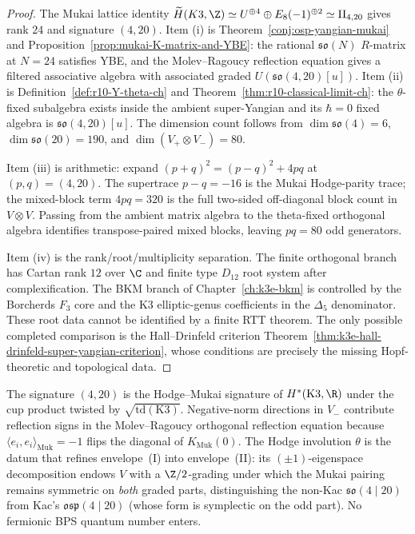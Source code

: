 \begin{proof}
The Mukai lattice identity
$\widetilde H(K3,\Z)\simeq U^{\oplus 4}\oplus E_8(-1)^{\oplus 2}
\simeq \mathrm{II}_{4,20}$ gives rank $24$ and signature $(4,20)$.
Item \textup{(i)} is Theorem~\ref{conj:osp-yangian-mukai} and
Proposition~\ref{prop:mukai-K-matrix-and-YBE}: the rational
$\mathfrak{so}(N)$ $R$-matrix at $N=24$ satisfies YBE, and the
Molev--Ragoucy reflection equation gives a filtered associative
algebra with associated graded $U(\mathfrak{so}(4,20)[u])$.
Item \textup{(ii)} is Definition~\ref{def:r10-Y-theta-ch} and
Theorem~\ref{thm:r10-classical-limit-ch}: the $\theta$-fixed
subalgebra exists inside the ambient super-Yangian and its
$\hbar=0$ fixed algebra is $\mathfrak{so}(4,20)[u]$. The dimension
count follows from
$\dim\mathfrak{so}(4)=6$, $\dim\mathfrak{so}(20)=190$, and
$\dim(V_+\otimes V_-)=80$.

Item \textup{(iii)} is arithmetic: expand
$(p+q)^2=(p-q)^2+4pq$ at $(p,q)=(4,20)$. The supertrace
$p-q=-16$ is the Mukai Hodge-parity trace; the mixed-block term
$4pq=320$ is the full two-sided off-diagonal block count in
$V\otimes V$. Passing from the ambient matrix algebra to the
theta-fixed orthogonal algebra identifies transpose-paired mixed
blocks, leaving $pq=80$ odd generators.

Item \textup{(iv)} is the rank/root/multiplicity separation. The
finite orthogonal branch has Cartan rank $12$ over $\C$ and finite
type $D_{12}$ root system after complexification. The BKM branch of
Chapter~\ref{ch:k3e-bkm} is controlled by the Borcherds
$F_3$ core and the K3 elliptic-genus coefficients in the
$\Delta_5$ denominator. These root data cannot be identified by a
finite RTT theorem. The only possible completed comparison is the
Hall--Drinfeld criterion
Theorem~\ref{thm:k3e-hall-drinfeld-super-yangian-criterion}, whose
conditions are precisely the missing Hopf-theoretic and topological
data.
\end{proof}

\begin{remark}
\label{rem:k3-super-origin}
The signature $(4, 20)$ is the Hodge--Mukai signature of
$H^*(\mathrm{K3}, \R)$ under the cup product twisted by
$\sqrt{\mathrm{td}(\mathrm{K3})}$. Negative-norm directions in
$V_-$ contribute reflection signs in the Molev--Ragoucy orthogonal
reflection equation because $\langle e_i, e_i\rangle_{\mathrm{Muk}}
= -1$ flips the diagonal of $K_{\mathrm{Muk}}(0)$. The Hodge
involution $\theta$ is the datum that refines envelope~(I) into
envelope~(II): its $(\pm 1)$-eigenspace decomposition endows $V$
with a $\Z/2$-grading under which the Mukai pairing remains symmetric
on \emph{both} graded parts, distinguishing the non-Kac
$\mathfrak{so}(4 \mid 20)$ from Kac's $\mathfrak{osp}(4 \mid 20)$
(whose form is symplectic on the odd part). No fermionic BPS
quantum number enters.
\end{remark}

